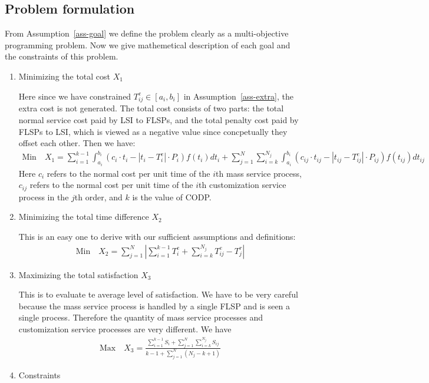 \documentclass{llncs}
\begin{document}
\subsection{Problem formulation}
From Assumption~\ref{ass-goal} we define the problem clearly as a multi-objective programming problem. Now we give mathemetical description of each goal and the constraints of this problem.
\begin{enumerate}
    \item Minimizing the total cost $X_1$
    
    Here since we have constrained $T_{ij}^e\in[a_i,b_i]$ in Assumption~\ref{ass-extra}, the extra cost is not generated. The total cost consists of two parts: the total normal service cost paid by LSI to FLSPs, and the total penalty cost paid by FLSPs to LSI, which is viewed as a negative value since concpetually they offset each other. Then we have:
    \begin{align}\label{goal-1}
        \text{Min} \quad X_1=\sum_{i=1}^{k-1}\int_{a_i}^{b_i}(c_i\cdot t_i-|t_i-T_i^e|\cdot P_i)f(t_i)dt_i+\sum_{j=1}^N\sum_{i=k}^{N_j}\int_{a_i}^{b_i}(c_{ij}\cdot t_{ij}-|t_{ij}-T_{ij}^e|\cdot P_{ij})f(t_{ij})dt_{ij}
    \end{align}
    Here $c_i$ refers to the normal cost per unit time of the $i$th mass service process, $c_{ij}$ refers to the normal cost per unit time of the $i$th customization service process in the $j$th order, and $k$ is the value of CODP.
    \item Minimizing the total time difference $X_2$
    
    This is an easy one to derive with our sufficient assumptions and definitions:
    \begin{align}\label{goal-2}
        \text{Min} \quad X_2=\sum_{j=1}^N\left|\sum_{i=1}^{k-1}T_i^e+\sum_{i=k}^{N_j}T_{ij}^e-T_j^r\right|
    \end{align}
    \item Maximizing the total satisfaction $X_3$
    
    This is to evaluate te average level of satisfaction. We have to be very careful because the mass service process is handled by a single FLSP and is seen a single process. Therefore the quantity of mass service processes and customization service processes are very different. We have
    \begin{align}\label{goal-3}
        \text{Max}\quad X_3=\frac{\sum_{i=1}^{k-1}S_i+\sum_{j=1}^{N}\sum_{i=k}^{N_j}S_{ij}}{k-1+\sum_{j=1}^N(N_j-k+1)}
    \end{align}
     \item Constraints
     

\end{enumerate}
\end{document}
